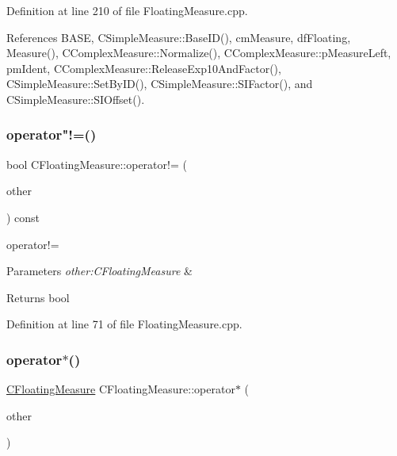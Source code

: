 Definition at line 210 of file Floating\+Measure.\+cpp.



References B\+A\+SE, C\+Simple\+Measure\+::\+Base\+I\+D(), cm\+Measure, df\+Floating, Measure(), C\+Complex\+Measure\+::\+Normalize(), C\+Complex\+Measure\+::p\+Measure\+Left, pm\+Ident, C\+Complex\+Measure\+::\+Release\+Exp10\+And\+Factor(), C\+Simple\+Measure\+::\+Set\+By\+I\+D(), C\+Simple\+Measure\+::\+S\+I\+Factor(), and C\+Simple\+Measure\+::\+S\+I\+Offset().

\mbox{\label{classCFloatingMeasure_afbedc9a56acac7c6738357ce2347aad3}} 
\subsubsection{\texorpdfstring{operator"!=()}{operator!=()}}
{\footnotesize\ttfamily bool C\+Floating\+Measure\+::operator!= (\begin{DoxyParamCaption}\item[{const \hyperlink{classCFloatingMeasure}{C\+Floating\+Measure} \&}]{other }\end{DoxyParamCaption}) const}



operator!= 


\begin{DoxyParams}{Parameters}
{\em other\+:\+C\+Floating\+Measure} & \\
\hline
\end{DoxyParams}
\begin{DoxyReturn}{Returns}
bool 
\end{DoxyReturn}


Definition at line 71 of file Floating\+Measure.\+cpp.

\mbox{\label{classCFloatingMeasure_a993623835ced24f74075861b2aab736e}} 
\subsubsection{\texorpdfstring{operator$\ast$()}{operator*()}\hspace{0.1cm}{\footnotesize\ttfamily [1/2]}}
{\footnotesize\ttfamily \hyperlink{classCFloatingMeasure}{C\+Floating\+Measure} C\+Floating\+Measure\+::operator$\ast$ (\begin{DoxyParamCaption}\item[{const \hyperlink{classCFloatingMeasure}{C\+Floating\+Measure} \&}]{other }\end{DoxyParamCaption})}



